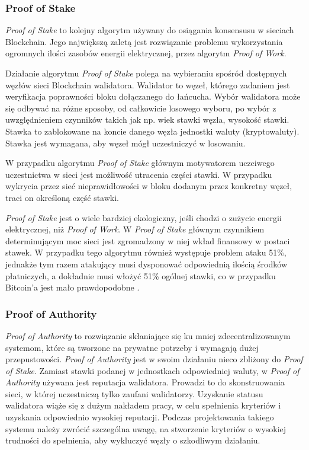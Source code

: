 \documentclass[a4paper,12pt]{book}
\begin{document}
\subsubsection{Proof of Stake}

\textit{Proof of Stake} to kolejny algorytm używany do osiągania konsensusu w sieciach Blockchain. Jego największą zaletą jest rozwiązanie problemu wykorzystania ogromnych ilości zasobów energii elektrycznej, przez algorytm \textit{Proof of Work}.

Działanie algorytmu \textit{Proof of Stake} polega na wybieraniu spośród dostępnych węzłów sieci Blockchain walidatora. Walidator to węzeł, którego zadaniem jest weryfikacja poprawności bloku dołączanego do łańcucha. Wybór walidatora może się odbywać na różne sposoby, od całkowicie losowego wyboru, po wybór z uwzględnieniem czynników takich jak np. wiek stawki węzła, wysokość stawki. Stawka to zablokowane na koncie danego węzła jednostki waluty (kryptowaluty). Stawka jest wymagana, aby węzeł mógł uczestniczyć w losowaniu.

W przypadku algorytmu \textit{Proof of Stake} głównym motywatorem uczciwego uczestnictwa w sieci jest możliwość utracenia części stawki. W przypadku wykrycia przez sieć nieprawidłowości w bloku dodanym przez konkretny węzeł, traci on określoną część stawki.

\textit{Proof of Stake} jest o wiele bardziej ekologiczny, jeśli chodzi o zużycie energii elektrycznej, niż \textit{Proof of Work}. W \textit{Proof of Stake} głównym czynnikiem determinującym moc sieci jest zgromadzony w niej wkład finansowy w postaci stawek. W przypadku tego algorytmu również występuje problem ataku 51\%, jednakże tym razem atakujący musi dysponować odpowiednią ilością środków płatniczych, a dokładnie musi włożyć 51\% ogólnej stawki, co w przypadku Bitcoin'a jest mało prawdopodobne \cite{abpos}.

\subsubsection{Proof of Authority}
\textit{Proof of Authority} to rozwiązanie skłaniające się ku mniej zdecentralizowanym systemom, które są tworzone na prywatne potrzeby i wymagają dużej przepustowości. \textit{Proof of Authority} jest w swoim działaniu nieco zbliżony do \textit{Proof of Stake}. Zamiast stawki podanej w jednostkach odpowiedniej waluty, w \textit{Proof of Authority} używana jest reputacja walidatora. Prowadzi to do skonstruowania sieci, w której uczestniczą tylko zaufani walidatorzy. Uzyskanie statusu walidatora wiąże się z dużym nakładem pracy, w celu spełnienia kryteriów i uzyskania odpowiednio wysokiej reputacji. Podczas projektowania takiego systemu należy zwrócić szczególna uwagę, na stworzenie kryteriów o wysokiej trudności do spełnienia, aby wykluczyć węzły o szkodliwym działaniu.
\end{document}

